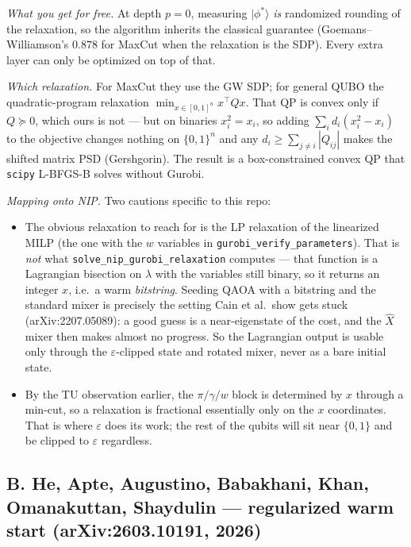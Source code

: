 \documentclass[11pt]{article}
\newcommand{\code}[1]{\texttt{#1}}
\begin{document}
\emph{What you get for free.} At depth $p = 0$, measuring $|\phi^*\rangle$ \emph{is} randomized rounding of the relaxation, so the algorithm inherits the classical guarantee (Goemans--Williamson's $0.878$ for MaxCut when the relaxation is the SDP). Every extra layer can only be optimized on top of that.

\emph{Which relaxation.} For MaxCut they use the GW SDP; for general QUBO the quadratic-program relaxation $\min_{x \in [0,1]^n} x^\top Q x$. That QP is convex only if $Q \succeq 0$, which ours is not --- but on binaries $x_i^2 = x_i$, so adding $\sum_i d_i (x_i^2 - x_i)$ to the objective changes nothing on $\{0,1\}^n$ and any $d_i \ge \sum_{j \ne i} |Q_{ij}|$ makes the shifted matrix PSD (Gershgorin). The result is a box-constrained convex QP that \code{scipy} L-BFGS-B solves without Gurobi.

\emph{Mapping onto NIP.} Two cautions specific to this repo:
\begin{itemize}[leftmargin=1.5em]
\item The obvious relaxation to reach for is the LP relaxation of the linearized MILP (the one with the $w$ variables in \code{gurobi\_verify\_parameters}). That is \emph{not} what \code{solve\_nip\_gurobi\_relaxation} computes --- that function is a Lagrangian bisection on $\lambda$ with the variables still binary, so it returns an integer $x$, i.e.\ a warm \emph{bitstring}. Seeding QAOA with a bitstring and the standard mixer is precisely the setting Cain et al.\ show gets stuck (arXiv:2207.05089): a good guess is a near-eigenstate of the cost, and the $\hat X$ mixer then makes almost no progress. So the Lagrangian output is usable only through the $\varepsilon$-clipped state and rotated mixer, never as a bare initial state.
\item By the TU observation earlier, the $\pi/\gamma/w$ block is determined by $x$ through a min-cut, so a relaxation is fractional essentially only on the $x$ coordinates. That is where $\varepsilon$ does its work; the rest of the qubits will sit near $\{0,1\}$ and be clipped to $\varepsilon$ regardless.
\end{itemize}

\subsection*{B. He, Apte, Augustino, Babakhani, Khan, Omanakuttan, Shaydulin --- regularized warm start (arXiv:2603.10191, 2026)}
\end{document}
